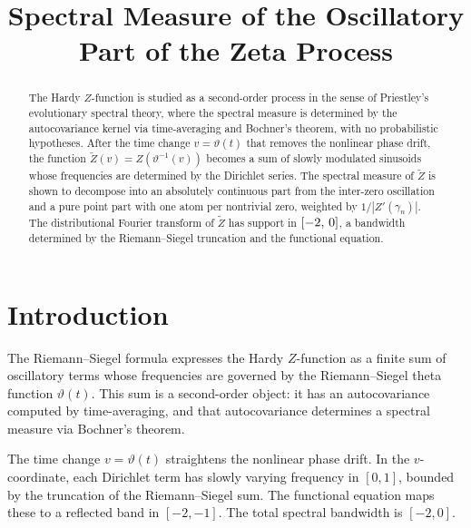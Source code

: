 \documentclass{article}
\begin{document}
\title{Spectral Measure of the Oscillatory Part of the Zeta Process}

\date{}

\maketitle

\begin{abstract}
  The Hardy $Z$-function is studied as a second-order process in the sense of
  Priestley's evolutionary spectral theory, where the spectral measure is
  determined by the autocovariance kernel via time-averaging and Bochner's
  theorem, with no probabilistic hypotheses. After the time change $v =
  \vartheta (t)$ that removes the nonlinear phase drift, the function
  $\tilde{Z} (v) = Z (\vartheta^{- 1} (v))$ becomes a sum of slowly modulated
  sinusoids whose frequencies are determined by the Dirichlet series. The
  spectral measure of $\tilde{Z}$ is shown to decompose into an absolutely
  continuous part from the inter-zero oscillation and a pure point part with
  one atom per nontrivial zero, weighted by $1 / |Z' (\gamma_n) |$. The
  distributional Fourier transform of $\tilde{Z}$ has support in $[- 2,
  \hspace{0.17em} 0]$, a bandwidth determined by the Riemann--Siegel
  truncation and the functional equation.
\end{abstract}

{\tableofcontents}

\section{Introduction}\label{sec:intro}

The Riemann--Siegel formula expresses the Hardy $Z$-function as a finite sum
of oscillatory terms whose frequencies are governed by the Riemann--Siegel
theta function $\vartheta (t)$. This sum is a second-order object: it has an
autocovariance computed by time-averaging, and that autocovariance determines
a spectral measure via Bochner's theorem.

The time change $v = \vartheta (t)$ straightens the nonlinear phase drift. In
the $v$-coordinate, each Dirichlet term has slowly varying frequency in $[0,
1]$, bounded by the truncation of the Riemann--Siegel sum. The functional
equation maps these to a reflected band in $[- 2, - 1]$. The total spectral
bandwidth is $[- 2, 0]$.
\end{document}
